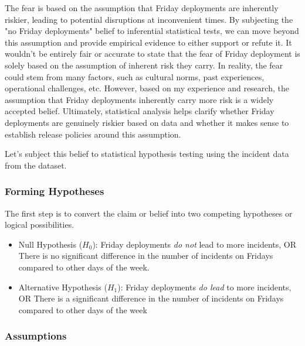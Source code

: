 \documentclass{article}
\begin{document}
The fear is based on the assumption that Friday deployments are inherently riskier, leading to potential disruptions at inconvenient times. By subjecting the "no Friday deployments" belief to inferential statistical tests, we can move beyond this assumption and provide empirical evidence to either support or refute it. It wouldn't be entirely fair or accurate to state that the fear of Friday deployment is solely based on the assumption of inherent risk they carry. In reality, the fear could stem from many factors, such as cultural norms, past experiences, operational challenges, etc. However, based on my experience and research, the assumption that Friday deployments inherently carry more risk is a widely accepted belief. Ultimately, statistical analysis helps clarify whether Friday deployments are genuinely riskier based on data and whether it makes sense to establish release policies around this assumption.

Let's subject this belief to statistical hypothesis testing using the incident data from the dataset.

\subsubsection{Forming Hypotheses}

The first step is to convert the claim or belief into two competing hypotheses or logical possibilities.

\begin{itemize}
    \item Null Hypothesis ($H_0$): Friday deployments \textit{do not} lead to more incidents, OR There is no significant difference in the number of incidents on Fridays compared to other days of the week.

    \item Alternative Hypothesis ($H_1$): Friday deployments \textit{do lead} to more incidents, OR There is a significant difference in the number of incidents on Fridays compared to other days of the week
\end{itemize}

\subsubsection{Assumptions}
\end{document}
